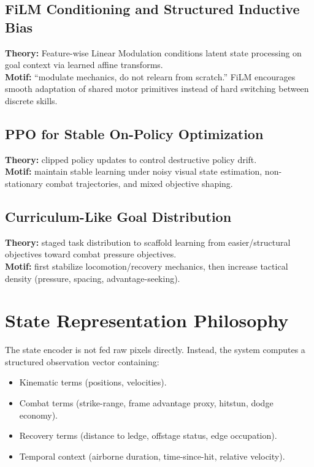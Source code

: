 \documentclass[11pt,a4paper]{article}
\begin{document}
\subsection{FiLM Conditioning and Structured Inductive Bias}
\textbf{Theory:} Feature-wise Linear Modulation conditions latent state processing on goal context via learned affine transforms.\\
\textbf{Motif:} ``modulate mechanics, do not relearn from scratch.'' FiLM encourages smooth adaptation of shared motor primitives instead of hard switching between discrete skills.

\subsection{PPO for Stable On-Policy Optimization}
\textbf{Theory:} clipped policy updates to control destructive policy drift.\\
\textbf{Motif:} maintain stable learning under noisy visual state estimation, non-stationary combat trajectories, and mixed objective shaping.

\subsection{Curriculum-Like Goal Distribution}
\textbf{Theory:} staged task distribution to scaffold learning from easier/structural objectives toward combat pressure objectives.\\
\textbf{Motif:} first stabilize locomotion/recovery mechanics, then increase tactical density (pressure, spacing, advantage-seeking).

\section{State Representation Philosophy}
The state encoder is not fed raw pixels directly. Instead, the system computes a structured observation vector containing:
\begin{itemize}[leftmargin=1.5em]
    \item Kinematic terms (positions, velocities).
    \item Combat terms (strike-range, frame advantage proxy, hitstun, dodge economy).
    \item Recovery terms (distance to ledge, offstage status, edge occupation).
    \item Temporal context (airborne duration, time-since-hit, relative velocity).
\end{itemize}
\end{document}
